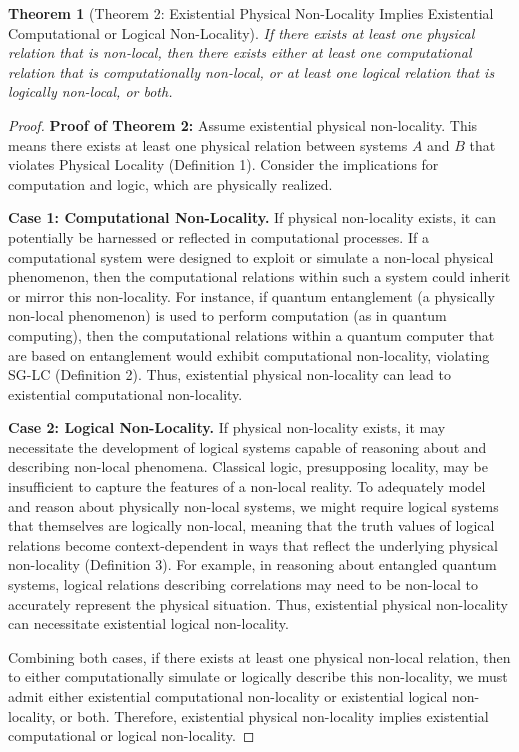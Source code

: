 \documentclass{article}
\newtheorem{theorem}{Theorem}
\begin{document}
	\begin{theorem}[Theorem 2: Existential Physical Non-Locality Implies Existential Computational or Logical Non-Locality]
		If there exists at least one physical relation that is non-local, then there exists either at least one computational relation that is computationally non-local, or at least one logical relation that is logically non-local, or both.
	\end{theorem}
	\begin{proof}
		\textbf{Proof of Theorem 2:} Assume existential physical non-locality. This means there exists at least one physical relation between systems $A$ and $B$ that violates Physical Locality (Definition 1). Consider the implications for computation and logic, which are physically realized.

		\textbf{Case 1: Computational Non-Locality.} If physical non-locality exists, it can potentially be harnessed or reflected in computational processes. If a computational system were designed to exploit or simulate a non-local physical phenomenon, then the computational relations within such a system could inherit or mirror this non-locality. For instance, if quantum entanglement (a physically non-local phenomenon) is used to perform computation (as in quantum computing), then the computational relations within a quantum computer that are based on entanglement would exhibit computational non-locality, violating SG-LC (Definition 2). Thus, existential physical non-locality can lead to existential computational non-locality.

		\textbf{Case 2: Logical Non-Locality.}  If physical non-locality exists, it may necessitate the development of logical systems capable of reasoning about and describing non-local phenomena. Classical logic, presupposing locality, may be insufficient to capture the features of a non-local reality. To adequately model and reason about physically non-local systems, we might require logical systems that themselves are logically non-local, meaning that the truth values of logical relations become context-dependent in ways that reflect the underlying physical non-locality (Definition 3). For example, in reasoning about entangled quantum systems, logical relations describing correlations may need to be non-local to accurately represent the physical situation. Thus, existential physical non-locality can necessitate existential logical non-locality.

		Combining both cases, if there exists at least one physical non-local relation, then to either computationally simulate or logically describe this non-locality, we must admit either existential computational non-locality or existential logical non-locality, or both. Therefore, existential physical non-locality implies existential computational or logical non-locality.
	\end{proof}
\end{document}
